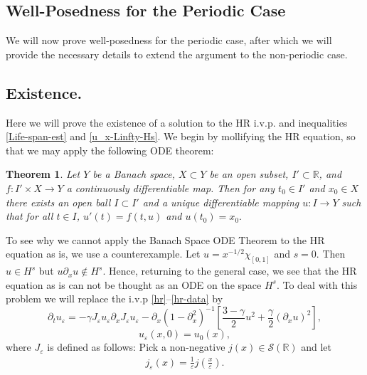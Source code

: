 \documentclass[12pt,reqno]{amsart}
\newcommand{\rr}{\mathbb{R}}
\newcommand{\p}{\partial}
\newcommand{\ee}{\varepsilon}
\theoremstyle{plain}  %
\newtheorem{theorem}{Theorem}
\theoremstyle{definition}
\begin{document}
%
%
%	
%
%
%
%
%
%
%
%
%
%
\begin{appendices}
\section{Well-Posedness for the Periodic Case}
%
%
%
%
We will now prove well-posedness for the periodic case, after which we will
provide the necessary details to extend the argument to the non-periodic case.
\vskip0.1in
\subsection{Existence.}
\vskip0.1in
\label{existence}
\setcounter{equation}{0}
\vskip0.1in
Here we will prove the existence of a solution to the HR i.v.p. and inequalities
\eqref{Life-span-est} and \eqref{u_x-Linfty-Hs}.  We begin by mollifying the HR equation, so that we may apply the following ODE
theorem: 
%
\vskip0.1in
\begin{theorem}
	\label{ode_theorem}
	Let  $Y$  be a Banach space, $X\subset Y$ be an open subset,
	$I' \subset \rr$, and $f: I' \times X\to Y$ a continuously differentiable
	map.  Then for any $t_{0} \in I'$ and $x_{0} \in X$ there exists an
	open ball $I \subset I'$ and a unique differentiable mapping $u:I
	\to Y$ such that for all $t \in I$,  $u'(t) = f(t, u)$
	and $u(t_{0}) = x_{0}.$
\end{theorem}
%
To see why we cannot apply the Banach Space ODE Theorem to the HR equation as is,
we use a counterexample. Let $u=x^{-1/2} \chi_{[0,1]}$ and $s=0$. Then $u \in H^s$ but
$u\p_x u \notin H^s$. Hence, returning to the general case, we see that the
HR equation as is can not be thought as an ODE on the space $H^s$.  To
deal with this problem we will replace the i.v.p \eqref{hr}--\eqref{hr-data} by  
\begin{equation}
	\label{hr-moli}
	\p_t  u_\ee =
	-\gamma J_\ee u_\ee \partial_x  J_\ee  u_\ee - \p_x (1-\p_x^2)^{-1} 
	\left [\frac{3-\gamma}{2}u^2 + \frac{\gamma}{2}(\p_x u)^2 \right ],
\end{equation} 
%
\begin{equation} 
	\label{hr-moli-data} 
	u_\ee(x, 0) = u_0 (x),
\end{equation}
%
where $J_\ee$ is defined as follows: Pick a non-negative $j(x) \in
\mathcal{S}(\rr)$ and let
\begin{equation*}
	\begin{split}
		j_\ee(x) = \frac{1}{\ee}j\left( \frac{x}{\ee} \right).

\end{split}
\end{equation*}
\end{appendices}
\end{document}
